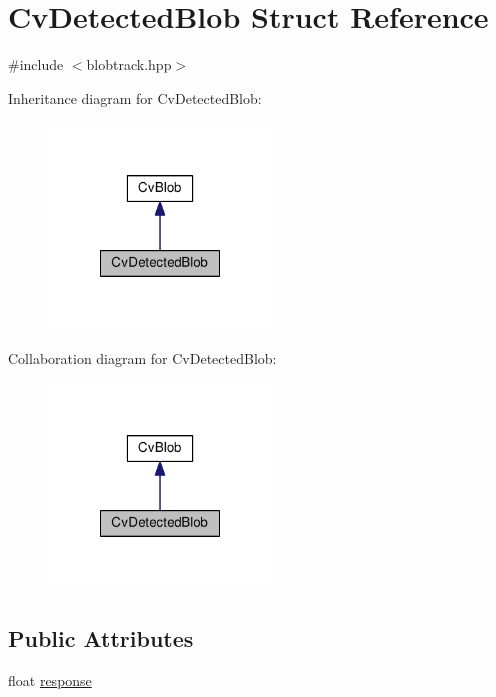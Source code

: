 \hypertarget{structCvDetectedBlob}{\section{Cv\-Detected\-Blob Struct Reference}
\label{structCvDetectedBlob}
}


{\ttfamily \#include $<$blobtrack.\-hpp$>$}



Inheritance diagram for Cv\-Detected\-Blob\-:\nopagebreak
\begin{figure}[H]
\begin{center}
\leavevmode
\includegraphics[width=168pt]{structCvDetectedBlob__inherit__graph}
\end{center}
\end{figure}


Collaboration diagram for Cv\-Detected\-Blob\-:\nopagebreak
\begin{figure}[H]
\begin{center}
\leavevmode
\includegraphics[width=168pt]{structCvDetectedBlob__coll__graph}
\end{center}
\end{figure}
\subsection*{Public Attributes}
\begin{DoxyCompactItemize}
\item 
float \hyperlink{structCvDetectedBlob_a0746004f078d8430527bdcb414856e38}{response}
\end{DoxyCompactItemize}


